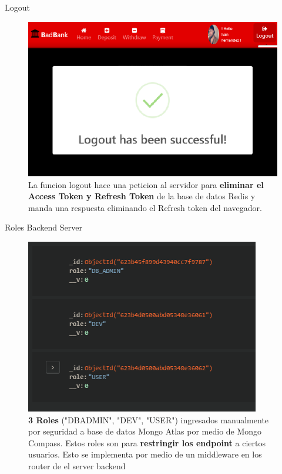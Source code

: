 \documentclass[xcolor=pdftex,dvipsnames,table]{beamer}
\begin{document}
\begin{frame}{Logout}
    \begin{figure}[htb]
        \centering
        \captionsetup{justification=centering,margin=0.3cm}
        \includegraphics[width=0.8\linewidth]{extras/logout.png}
        \caption*{\footnotesize  La funcion logout hace una peticion al servidor para  \textbf{eliminar el Access Token y Refresh Token} de la base de datos Redis y manda una respuesta eliminando el Refresh token del navegador.   }
    \end{figure} 
\end{frame}
\begin{frame}{Roles Backend Server}
    \begin{figure}[htb]
        \centering
        \captionsetup{justification=centering,margin=0.3cm}
        \includegraphics[width=0.6\linewidth]{extras/roles.png}
        \caption*{\footnotesize{  \textbf{3 Roles} ("DBADMIN", "DEV", "USER") ingresados manualmente por seguridad a base de datos Mongo Atlas por medio de Mongo Compass. Estos roles son para  \textbf{restringir los endpoint} a ciertos usuarios. Esto se implementa por medio de un middleware en los router de el server backend}}
    \end{figure} 
\end{frame}
\end{document}
